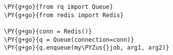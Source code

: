 \begin{Verbatim}[commandchars=\\\{\}]
\PY{g+go}{from rq import Queue}
\PY{g+go}{from redis import Redis}

\PY{g+go}{conn = Redis()}
\PY{g+go}{q = Queue(connection=conn)}
\PY{g+go}{q.enqueue(my\PYZus{}job, arg1, arg2)}
\end{Verbatim}
